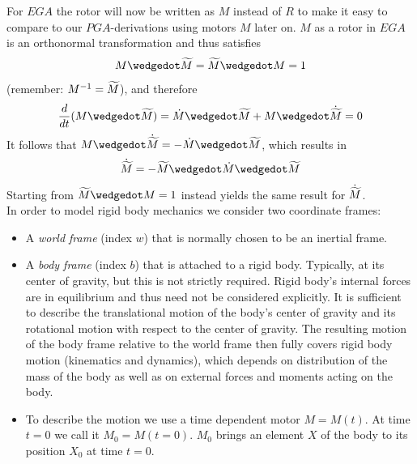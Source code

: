 For $EGA$ the rotor will now be written as $M$ instead of $R$ to make it easy to compare
to our $PGA$-derivations using motors $M$ later on. $M$ as a rotor in $EGA$ is an
orthonormal transformation and thus satisfies
\begin{equation}
M \wedgedot \rev{M} = \rev{M} \wedgedot M = 1
\label{eq:motor_relation_gpr_neutral_element}
\end{equation}
(remember: $M^{-1} = \widetilde{M}$), and therefore
\begin{equation}
   \frac{d}{dt}(M\wedgedot\rev{M}) = \dot{M}\wedgedot\rev{M} + M\wedgedot\dot{\rev{M}} = 0
   \label{eq:dot_rev_m}
\end{equation}
It follows that $M\wedgedot\dot{\rev{M}} = -\dot{M}\wedgedot\rev{M}$, which results in
\begin{equation}
   \dot{\rev{M}} = -\rev{M}\wedgedot\dot{M}\wedgedot\rev{M}
   \label{eq:dot_rev_m_as_dot_m}
\end{equation}
Starting from $\rev{M} \wedgedot M = 1$ instead yields the same result for
$\dot{\widetilde{M}}$. \\

In order to model rigid body mechanics we consider two coordinate frames:
\begin{itemize}
   \item A \emph{world frame} (index $w$) that is normally chosen to be an inertial frame.
   \item A \emph{body frame} (index $b$) that is attached to a rigid body. Typically, at
   its center of gravity, but this is not strictly required. Rigid body's internal forces
   are in equilibrium and thus need not be considered explicitly. It is sufficient to
   describe the translational motion of the body's center of gravity and its rotational
   motion with respect to the center of gravity. The resulting motion of the body frame
   relative to the world frame then fully covers rigid body motion (kinematics and
   dynamics), which depends on distribution of the mass of the body as well as on external
   forces and moments acting on the body.
   \item To describe the motion we use a time dependent motor $M=M(t)$. At time $t=0$ we
   call it $M_0 = M(t=0)$. $M_0$ brings an element $X$ of the body to its position $X_0$
   at time $t=0$.
\end{itemize}

